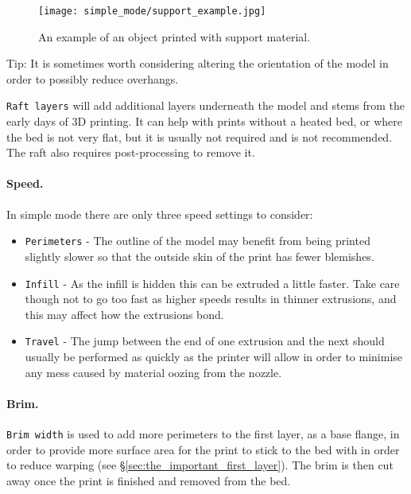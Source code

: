 \begin{figure}[H]
\centering
\texttt{[image: simple\_mode/support\_example.jpg]}
\caption{An example of an object printed with support material.}
\label{fig:support_example}
\end{figure}

Tip: It is sometimes worth considering altering the orientation of the model in order to possibly reduce overhangs.

\texttt{Raft layers} will add additional layers underneath the model and stems from the early days of 3D printing.  It can help with prints without a heated bed, or where the bed is not very flat, but it is usually not required and is not recommended.  The raft also requires post-processing to remove it.

\paragraph{Speed.} %
\label{par:simple_speed}
In simple mode there are only three speed settings to consider:
\begin{itemize}
	\item \texttt{Perimeters}  - The outline of the model may benefit from being printed slightly slower so that the outside skin of the print has fewer blemishes.
	\item \texttt{Infill}  - As the infill is hidden this can be extruded a little faster.  Take care though not to go too fast as higher speeds results in thinner extrusions, and this may affect how the extrusions bond.
	\item \texttt{Travel}  - The jump between the end of one extrusion and the next should usually be performed as quickly as the printer will allow in order to minimise any mess caused by material oozing from the nozzle.
\end{itemize}

\paragraph{Brim.} %
\label{par:simple_brim}
\texttt{Brim width} is used to add more perimeters to the first layer, as a base flange, in order to provide more surface area for the print to stick to the bed with in order to reduce warping (see §\ref{sec:the_important_first_layer}). The brim is then cut away once the print is finished and removed from the bed.


